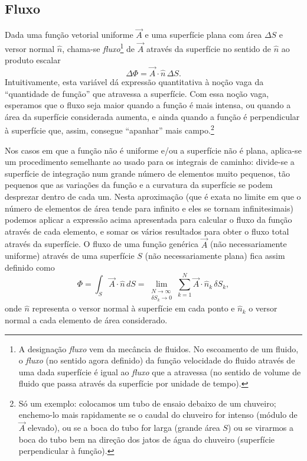 \subsection{Fluxo}
Dada uma função vetorial uniforme $\vec A$ e uma superfície plana com área
$\Delta S$ e versor normal $\hat n$, chama-se \emph{fluxo}\footnote{A designação
\emph{fluxo} vem da mecância de fluidos. No escoamento de um fluido, o
\emph{fluxo} (no sentido agora definido) da função velocidade do fluido através
de uma dada superfície é igual ao \emph{fluxo} que a atravessa (no sentido de
volume de fluido que passa através da superfície por unidade de tempo).}
de $\vec A$ através da superfície no sentido de $\hat n$ ao produto escalar
\begin{equation*}
\Delta \Phi=\vec A\cdot \hat n\,\Delta S.
\end{equation*}
Intuitivamente, esta variável dá expressão quantitativa à noção vaga da
``quantidade de função'' que atravessa a superfície. Com essa noção vaga,
esperamos que o fluxo seja maior quando a função é mais intensa, ou quando a
área da superfície considerada aumenta, e ainda quando a função é perpendicular
à superfície que, assim, consegue ``apanhar'' mais campo.\footnote{Só um
exemplo: colocamos um tubo de ensaio debaixo de um chuveiro; enchemo-lo mais
rapidamente se o caudal do chuveiro for intenso (módulo de $\vec A$ elevado), ou
se a boca do tubo for larga (grande área $S$) ou se virarmos a boca do tubo bem
na direção dos jatos de água do chuveiro (superfície perpendicular à função).}

Nos casos em que a função não é uniforme e/ou a superfície não é plana,
aplica-se um procedimento semelhante ao usado para os integrais de caminho:
divide-se a superfície de integração num grande número de elementos muito
pequenos, tão pequenos que as variações da função e a curvatura da superfície se
podem desprezar dentro de cada um. Nesta aproximação (que é exata no limite em
que o número de elementos de área tende para infinito e eles se tornam
infinitesimais) podemos aplicar a expressão acima apresentada para calcular o
fluxo da função através de cada elemento, e somar os vários resultados para
obter o fluxo total através da superfície. O fluxo de uma função genérica $\vec
A$ (não necessariamente uniforme) através de uma superfície $S$ (não
necessariamente plana) fica assim definido como
\begin{equation*}
\Phi = \int_S \vec A\cdot\hat n \, dS =
\lim_{\substack{N\to\infty\\\delta S_k\to0}}
\sum_{k=1}^N\vec A\cdot\hat n_k\,\delta S_k,
\end{equation*}
onde $\hat n$ representa o versor normal à superfície em cada ponto e $\hat n_k$
o versor normal a cada elemento de área considerado.

